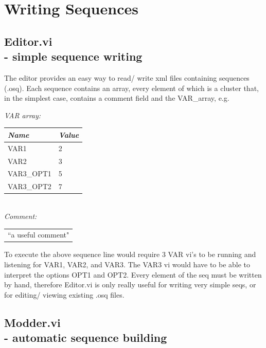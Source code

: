 \documentclass[10pt,a4paper]{article}
\begin{document}
\section{Writing Sequences}

\subsection[Editor.vi ]{Editor.vi \\ %
	\normalsize - simple sequence writing}
The editor provides an easy way to read/ write xml files containing sequences (.osq).  Each sequence contains an array, every element of which is a cluster that, in the simplest case, contains a comment field and the VAR\_array, e.g.

\hangindent=0.7cm
\emph{VAR array:} \\
\begin{tabularx}{0.4\textwidth}{X|X}
	\emph{Name} & \emph{Value} \\
	\hline
	VAR1 & 2 \\
	VAR2 & 3 \\
	VAR3\_OPT1 & 5 \\
	VAR3\_OPT2 & 7
\end{tabularx}
\vspace{3mm} \\
\emph{Comment:} \\
\begin{tabularx}{0.85\textwidth}{l}
	``a useful comment"
\end{tabularx}
\vspace{3mm}

To execute the above sequence line would require 3 VAR vi's to be running and listening for VAR1, VAR2, and VAR3.  The VAR3 vi would have to be able to interpret the options OPT1 and OPT2.  Every element of the seq must be written by hand, therefore Editor.vi is only really useful for writing very simple seqs, or for editing/ viewing existing .osq files.

\subsection[Modder.vi]{\label{sex:modder}Modder.vi \\ %
	\normalsize - automatic sequence building}
\end{document}
